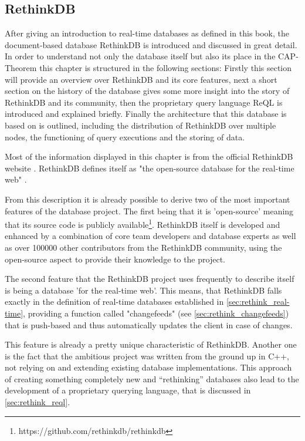 \subsection{RethinkDB}
After giving an introduction to real-time databases as defined in this book, the document-based database RethinkDB is introduced and discussed in great detail. In order to understand not only the database itself but also its place in the CAP-Theorem this chapter is structured in the following sections: Firstly this section will provide an overview over RethinkDB and its core features, next a short section on the history of the database gives some more insight into the story of RethinkDB and its community, then the proprietary query language ReQL is introduced and explained briefly. Finally the architecture that this database is based on is outlined, including the distribution of RethinkDB over multiple nodes, the functioning of query executions and the storing of data.


Most of the information displayed in this chapter is from the official RethinkDB website \autocite{rethinkdb}.\bigskip
RethinkDB defines itself as "the open-source database for the real-time web" \autocite{rethinkdb}.


From this description it is already possible to derive two of the most important features of the database project. The first being that it is 'open-source' meaning that its source code is publicly available\footnote{https://github.com/rethinkdb/rethinkdb}. RethinkDB itself is developed and enhanced by a combination of core team developers and database experts as well as over 100000 other contributors from the RethinkDB community, using the open-source aspect to provide their knowledge to the project.


The second feature that the RethinkDB project uses frequently to describe itself is being a database 'for the real-time web'. This means, that RethinkDB falls exactly in the definition of real-time databases established in \autoref{sec:rethink_real-time}, providing a function called "changefeeds" (see \autoref{sec:rethink_changefeeds}) that is push-based and thus automatically updates the client in case of changes.


This feature is already a pretty unique characteristic of RethinkDB.
Another one is the fact that the ambitious project was written from the ground up in C++, not relying on and extending existing database implementations.
This approach of creating something completely new and \enquote{rethinking} databases also lead to the development of a proprietary querying language, that is discussed in \autoref{sec:rethink_reql}.

